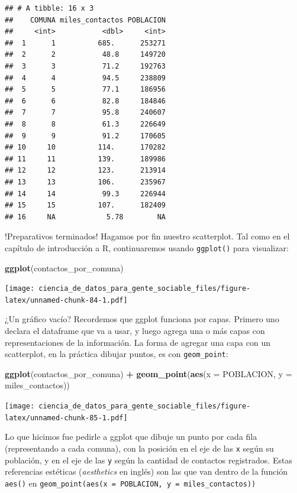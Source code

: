 \documentclass[spanish,]{book}
\newenvironment{Shaded}{\begin{snugshade}}{\end{snugshade}}
\newcommand{\DataTypeTok}[1]{\textcolor[rgb]{0.13,0.29,0.53}{#1}}
\newcommand{\KeywordTok}[1]{\textcolor[rgb]{0.13,0.29,0.53}{\textbf{#1}}}
\newcommand{\NormalTok}[1]{#1}
\newcommand{\OperatorTok}[1]{\textcolor[rgb]{0.81,0.36,0.00}{\textbf{#1}}}
\newcommand{\StringTok}[1]{\textcolor[rgb]{0.31,0.60,0.02}{#1}}
\begin{document}
\begin{verbatim}
## # A tibble: 16 x 3
##    COMUNA miles_contactos POBLACION
##     <int>           <dbl>     <int>
##  1      1          685.      253271
##  2      2           48.8     149720
##  3      3           71.2     192763
##  4      4           94.5     238809
##  5      5           77.1     186956
##  6      6           82.8     184846
##  7      7           95.8     240607
##  8      8           61.3     226649
##  9      9           91.2     170605
## 10     10          114.      170282
## 11     11          139.      189986
## 12     12          123.      213914
## 13     13          106.      235967
## 14     14           99.3     226944
## 15     15          107.      182409
## 16     NA            5.78        NA
\end{verbatim}

!Preparativos terminados! Hagamos por fin nuestro scatterplot. Tal como en el capítulo de introducción a R, continuaremos usando \texttt{ggplot()} para visualizar:

\begin{Shaded}
\begin{Highlighting}[]
\KeywordTok{ggplot}\NormalTok{(contactos_por_comuna)}
\end{Highlighting}
\end{Shaded}

\texttt{[image: ciencia\_de\_datos\_para\_gente\_sociable\_files/figure-latex/unnamed-chunk-84-1.pdf]}

¿Un gráfico vacío? Recordemos que ggplot funciona por capas. Primero uno declara el dataframe que va a usar, y luego agrega una o más capas con representaciones de la información. La forma de agregar una capa con un scatterplot, en la práctica dibujar puntos, es con \texttt{geom\_point}:

\begin{Shaded}
\begin{Highlighting}[]
\KeywordTok{ggplot}\NormalTok{(contactos_por_comuna) }\OperatorTok{+}\StringTok{ }\KeywordTok{geom_point}\NormalTok{(}\KeywordTok{aes}\NormalTok{(}\DataTypeTok{x =}\NormalTok{ POBLACION, }\DataTypeTok{y =}\NormalTok{ miles_contactos))}
\end{Highlighting}
\end{Shaded}

\texttt{[image: ciencia\_de\_datos\_para\_gente\_sociable\_files/figure-latex/unnamed-chunk-85-1.pdf]}

Lo que hicimos fue pedirle a ggplot que dibuje un punto por cada fila (representando a cada comuna), con la posición en el eje de las \texttt{x} según su población, y en el eje de las \texttt{y} según la cantidad de contactos registrados. Estas referencias estéticas (\emph{aesthetics} en inglés) son las que van dentro de la función \texttt{aes()} en \texttt{geom\_point(aes(x\ =\ POBLACION,\ y\ =\ miles\_contactos))}
\end{document}
